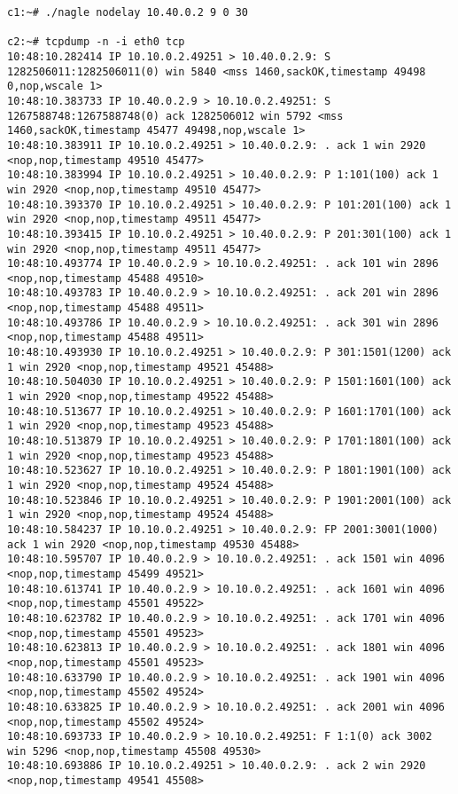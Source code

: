 \documentclass[a4paper,12pt]{article}
\begin{document}
\begin{Verbatim}
c1:~# ./nagle nodelay 10.40.0.2 9 0 30

c2:~# tcpdump -n -i eth0 tcp
10:48:10.282414 IP 10.10.0.2.49251 > 10.40.0.2.9: S 1282506011:1282506011(0) win 5840 <mss 1460,sackOK,timestamp 49498 0,nop,wscale 1>
10:48:10.383733 IP 10.40.0.2.9 > 10.10.0.2.49251: S 1267588748:1267588748(0) ack 1282506012 win 5792 <mss 1460,sackOK,timestamp 45477 49498,nop,wscale 1>
10:48:10.383911 IP 10.10.0.2.49251 > 10.40.0.2.9: . ack 1 win 2920 <nop,nop,timestamp 49510 45477>
10:48:10.383994 IP 10.10.0.2.49251 > 10.40.0.2.9: P 1:101(100) ack 1 win 2920 <nop,nop,timestamp 49510 45477>
10:48:10.393370 IP 10.10.0.2.49251 > 10.40.0.2.9: P 101:201(100) ack 1 win 2920 <nop,nop,timestamp 49511 45477>
10:48:10.393415 IP 10.10.0.2.49251 > 10.40.0.2.9: P 201:301(100) ack 1 win 2920 <nop,nop,timestamp 49511 45477>
10:48:10.493774 IP 10.40.0.2.9 > 10.10.0.2.49251: . ack 101 win 2896 <nop,nop,timestamp 45488 49510>
10:48:10.493783 IP 10.40.0.2.9 > 10.10.0.2.49251: . ack 201 win 2896 <nop,nop,timestamp 45488 49511>
10:48:10.493786 IP 10.40.0.2.9 > 10.10.0.2.49251: . ack 301 win 2896 <nop,nop,timestamp 45488 49511>
10:48:10.493930 IP 10.10.0.2.49251 > 10.40.0.2.9: P 301:1501(1200) ack 1 win 2920 <nop,nop,timestamp 49521 45488>
10:48:10.504030 IP 10.10.0.2.49251 > 10.40.0.2.9: P 1501:1601(100) ack 1 win 2920 <nop,nop,timestamp 49522 45488>
10:48:10.513677 IP 10.10.0.2.49251 > 10.40.0.2.9: P 1601:1701(100) ack 1 win 2920 <nop,nop,timestamp 49523 45488>
10:48:10.513879 IP 10.10.0.2.49251 > 10.40.0.2.9: P 1701:1801(100) ack 1 win 2920 <nop,nop,timestamp 49523 45488>
10:48:10.523627 IP 10.10.0.2.49251 > 10.40.0.2.9: P 1801:1901(100) ack 1 win 2920 <nop,nop,timestamp 49524 45488>
10:48:10.523846 IP 10.10.0.2.49251 > 10.40.0.2.9: P 1901:2001(100) ack 1 win 2920 <nop,nop,timestamp 49524 45488>
10:48:10.584237 IP 10.10.0.2.49251 > 10.40.0.2.9: FP 2001:3001(1000) ack 1 win 2920 <nop,nop,timestamp 49530 45488>
10:48:10.595707 IP 10.40.0.2.9 > 10.10.0.2.49251: . ack 1501 win 4096 <nop,nop,timestamp 45499 49521>
10:48:10.613741 IP 10.40.0.2.9 > 10.10.0.2.49251: . ack 1601 win 4096 <nop,nop,timestamp 45501 49522>
10:48:10.623782 IP 10.40.0.2.9 > 10.10.0.2.49251: . ack 1701 win 4096 <nop,nop,timestamp 45501 49523>
10:48:10.623813 IP 10.40.0.2.9 > 10.10.0.2.49251: . ack 1801 win 4096 <nop,nop,timestamp 45501 49523>
10:48:10.633790 IP 10.40.0.2.9 > 10.10.0.2.49251: . ack 1901 win 4096 <nop,nop,timestamp 45502 49524>
10:48:10.633825 IP 10.40.0.2.9 > 10.10.0.2.49251: . ack 2001 win 4096 <nop,nop,timestamp 45502 49524>
10:48:10.693733 IP 10.40.0.2.9 > 10.10.0.2.49251: F 1:1(0) ack 3002 win 5296 <nop,nop,timestamp 45508 49530>
10:48:10.693886 IP 10.10.0.2.49251 > 10.40.0.2.9: . ack 2 win 2920 <nop,nop,timestamp 49541 45508>


\end{Verbatim}
\end{document}
